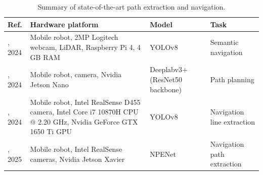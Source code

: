 \documentclass[preprint,12pt]{elsarticle}
\begin{document}
\begin{center}
\begin{table}
\caption{Summary of state-of-the-art path extraction and navigation.}
\scriptsize
\begin{tabular}{|p{1cm} | p{4.5cm} | p{4.5cm} | p{3.0cm} |}
 \hline
 Ref. & Hardware platform & Model & Task \\ 
 \hline
 \citep{alotaibi_deep_2024}, 2024 & Mobile robot, 2MP Logitech webcam, LiDAR, Raspberry Pi 4, 4 GB RAM & YOLOv8 & Semantic navigation \\ 
 \hline
 \citep{misir_drivable_2024}, 2024 & Mobile robot, camera, Nvidia Jetson Nano & Deeplabv3+ (ResNet50 backbone) & Path planning \\
 \hline
\citep{cao_orchard_2024}, 2024 & Mobile robot, Intel RealSense D455 camera, Intel Core i7 10870H CPU @ 2.20 GHz, Nvidia GeForce GTX 1650 Ti GPU  & YOLOv8 & Navigation line extraction \\
 \hline
 \citep{liu_single-stage_2025}, 2025 & Mobile robot, Intel RealSense cameras, Nvidia Jetson Xavier & NPENet & Navigation path extraction \\
 \hline
\end{tabular}
\label{table_summary_nav_studies}
\end{table}
\end{center}
\end{document}
